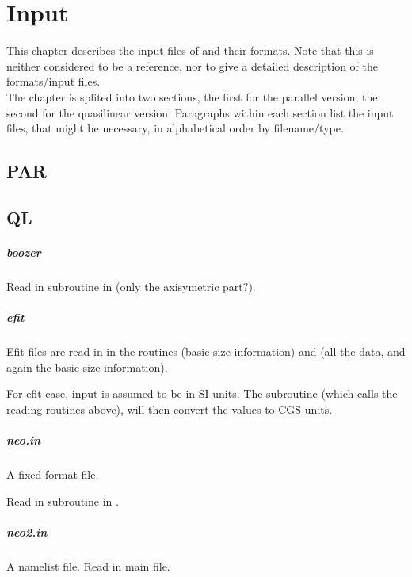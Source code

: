 \chapter{Input\label{ch:input}}
This chapter describes the input files of \neotwo and their formats.
Note that this is neither considered to be a reference, nor to give a
detailed description of the formats/input files.\\
The chapter is splited into two sections, the first for the parallel
version, the second for the quasilinear version. Paragraphs within each
section list the input files, that might be necessary, in alphabetical
order by filename/type.

\section{PAR}


\section{QL}


\paragraph{boozer}
Read in subroutine  in  (only
the axisymetric part?).

\paragraph{efit}
Efit files are read in  in the routines
 (basic size information) and
 (all the data, and again the basic size
information).

For efit case, input is assumed to be in SI units. The subroutine
 (which calls the reading routines above), will
then convert the values to CGS units.

\paragraph{neo.in}
A fixed format file.

Read in subroutine  in
.

\paragraph{neo2.in}
A namelist file.
Read in main file.

